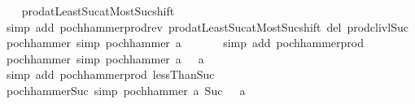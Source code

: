 \begin{isabellebody}
%
\isadelimproof
\ \ %
\endisadelimproof
%
\isatagproof
{}\isamarkupfalse%
\ prod{\isachardot}{\kern0pt}atLeast{\isacharunderscore}{\kern0pt}Suc{\isacharunderscore}{\kern0pt}atMost{\isacharunderscore}{\kern0pt}Suc{\isacharunderscore}{\kern0pt}shift\isanewline
\ \ \isamarkupfalse%
\ {\isacharparenleft}{\kern0pt}simp\ add{\isacharcolon}{\kern0pt}\ pochhammer{\isacharunderscore}{\kern0pt}prod{\isacharunderscore}{\kern0pt}rev\ prod{\isachardot}{\kern0pt}atLeast{\isacharunderscore}{\kern0pt}Suc{\isacharunderscore}{\kern0pt}atMost{\isacharunderscore}{\kern0pt}Suc{\isacharunderscore}{\kern0pt}shift\ del{\isacharcolon}{\kern0pt}\ prod{\isachardot}{\kern0pt}cl{\isacharunderscore}{\kern0pt}ivl{\isacharunderscore}{\kern0pt}Suc{\isacharparenright}{\kern0pt}%
\endisatagproof
{\isafoldproof}%
%
\isadelimproof
\isanewline
%
\endisadelimproof
\isanewline
{}\isamarkupfalse%
\ pochhammer{\isacharunderscore}{\kern0pt}{}\ {\isacharbrackleft}{\kern0pt}simp{\isacharbrackright}{\kern0pt}{\isacharcolon}{\kern0pt}\ {\isachardoublequoteopen}pochhammer\ a\ {}\ {\isacharequal}{\kern0pt}\ {}{\isachardoublequoteclose}\isanewline
%
\isadelimproof
\ \ %
\endisadelimproof
%
\isatagproof
{}\isamarkupfalse%
\ {\isacharparenleft}{\kern0pt}simp\ add{\isacharcolon}{\kern0pt}\ pochhammer{\isacharunderscore}{\kern0pt}prod{\isacharparenright}{\kern0pt}%
\endisatagproof
{\isafoldproof}%
%
\isadelimproof
\isanewline
%
\endisadelimproof
\isanewline
{}\isamarkupfalse%
\ pochhammer{\isacharunderscore}{\kern0pt}{}\ {\isacharbrackleft}{\kern0pt}simp{\isacharbrackright}{\kern0pt}{\isacharcolon}{\kern0pt}\ {\isachardoublequoteopen}pochhammer\ a\ {}\ {\isacharequal}{\kern0pt}\ a{\isachardoublequoteclose}\isanewline
%
\isadelimproof
\ \ %
\endisadelimproof
%
\isatagproof
{}\isamarkupfalse%
\ {\isacharparenleft}{\kern0pt}simp\ add{\isacharcolon}{\kern0pt}\ pochhammer{\isacharunderscore}{\kern0pt}prod\ lessThan{\isacharunderscore}{\kern0pt}Suc{\isacharparenright}{\kern0pt}%
\endisatagproof
{\isafoldproof}%
%
\isadelimproof
\isanewline
%
\endisadelimproof
\isanewline
{}\isamarkupfalse%
\ pochhammer{\isacharunderscore}{\kern0pt}Suc{}\ {\isacharbrackleft}{\kern0pt}simp{\isacharbrackright}{\kern0pt}{\isacharcolon}{\kern0pt}\ {\isachardoublequoteopen}pochhammer\ a\ {\isacharparenleft}{\kern0pt}Suc\ {}{\isacharparenright}{\kern0pt}\ {\isacharequal}{\kern0pt}\ a{\isachardoublequoteclose}\isanewline
%
\isadelimproof
\ \ %
\endisadelimproof

\end{isabellebody}
